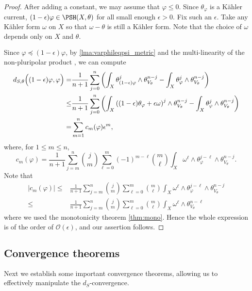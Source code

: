     \begin{proof}
        After adding a constant, we may assume that $\varphi\leq 0$. Since $\theta_{\varphi}$ is a Kähler current, $(1-\epsilon)\varphi\in \PSH(X,\theta)$ for all small enough $\epsilon>0$. Fix such an $\epsilon$. Take any Kähler form $\omega$ on $X$ so that $\omega-\theta$ is still a Kähler form. Note that the choice of $\omega$ depends only on $X$ and $\theta$.

        Since $\varphi\preceq (1-\epsilon)\varphi$, by \cref{lma:varphileqpsi_metric} and the multi-linearity of the non-pluripolar product , we can compute
        \[
        \begin{aligned}
            d_{S,\theta}\Bigl((1-\epsilon)\varphi,\varphi\Bigr)=& \frac{1}{n+1}\sum_{j=0}^n \left(\int_X \theta_{(1-\epsilon)\varphi}^j \wedge \theta_{V_{\theta}}^{n-j}-\int_X \theta_{\varphi}^j \wedge \theta_{V_{\theta}}^{n-j}\right)\\
            \leq & \frac{1}{n+1}\sum_{j=0}^n \left(\int_X \left((1-\epsilon)\theta_{\varphi}+\epsilon\omega\right)^j \wedge \theta_{V_{\theta}}^{n-j}-\int_X \theta_{\varphi}^j \wedge \theta_{V_{\theta}}^{n-j}\right)\\
            =&\sum_{m=1}^n c_m(\varphi)\epsilon^m,
        \end{aligned}
        \]
        where, for $1\leq m\leq n$,
        \[
            c_m(\varphi)=\frac{1}{n+1}\sum_{j=m}^n \binom{j}{m}
            \sum_{\ell=0}^m (-1)^{m-\ell}\binom{m}{\ell}
            \int_X \omega^\ell\wedge\theta_{\varphi}^{j-\ell}\wedge \theta_{V_{\theta}}^{n-j}.
        \]
        Note that
        \[
        \begin{aligned}
            \left|c_m(\varphi)\right| \leq & \frac{1}{n+1}\sum_{j=m}^n \binom{j}{m}
            \sum_{\ell=0}^m \binom{m}{\ell}
            \int_X \omega^\ell\wedge\theta_{\varphi}^{j-\ell}\wedge \theta_{V_{\theta}}^{n-j}\\
            \leq &  \frac{1}{n+1}\sum_{j=m}^n \binom{j}{m}
            \sum_{\ell=0}^m \binom{m}{\ell}
            \int_X \omega^\ell\wedge \theta_{V_{\theta}}^{n-\ell}
        \end{aligned}
        \]
        where we used the monotonicity theorem \cref{thm:mono}. Hence the whole expression is of the order of $\mathcal{O}(\epsilon)$, and our assertion follows.
    \end{proof}

\subsection{Convergence theorems}
\label{subsec:dS_conv}
Next we establish some important convergence theorems, allowing us to effectively manipulate the $d_S$-convergence.

